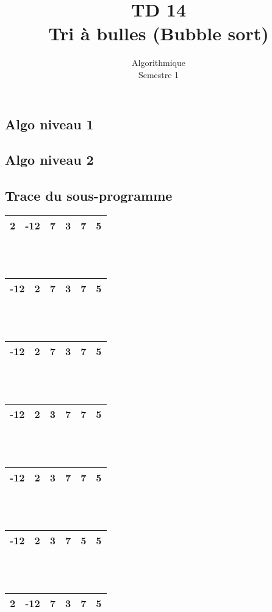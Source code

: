 \documentclass{article}
\title{TD 14\\ Tri à bulles (Bubble sort)}
\date{Algorithmique\\ Semestre 1}
\begin{document}
	\maketitle
	\section{}
		\subsection{Algo niveau 1}
			
		\subsection{Algo niveau 2}
			
		\subsection{Trace du sous-programme}
			\begin{tabular}{|c|c|c|c|c|c|}
				\hline
					2 & -12 & 7 & 3 & 7 & 5\\
				\hline
			\end{tabular}\\ \\ 
			\begin{tabular}{|c|c|c|c|c|c|}
				\hline
					-12 & 2 & 7 & 3 & 7 & 5\\
				\hline
			\end{tabular}\\ \\ 
			\begin{tabular}{|c|c|c|c|c|c|}
				\hline
					-12 & 2 & 7 & 3 & 7 & 5\\
				\hline
			\end{tabular}\\ \\ 
			\begin{tabular}{|c|c|c|c|c|c|}
				\hline
					-12 & 2 & 3 & 7 & 7 & 5\\
				\hline
			\end{tabular}\\ \\ 
			\begin{tabular}{|c|c|c|c|c|c|}
				\hline
					-12 & 2 & 3 & 7 & 7 & 5\\
				\hline
			\end{tabular}\\ \\ 
			\begin{tabular}{|c|c|c|c|c|c|}
				\hline
					-12 & 2 & 3 & 7 & 5 & 5\\
				\hline
			\end{tabular}\\ \\ 
			\begin{tabular}{|c|c|c|c|c|c|}
				\hline
					2 & -12 & 7 & 3 & 7 & 5\\
				\hline
			\end{tabular} 
\end{document}
